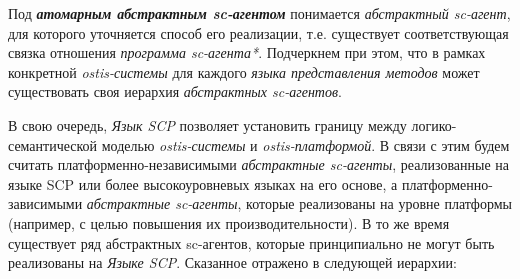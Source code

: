 Под \textbf{\textit{атомарным абстрактным sc-агентом}} понимается \textit{абстрактный sc-агент}, для которого уточняется способ его реализации, т.е. существует соответствующая связка отношения \textit{программа sc-агента*}. Подчеркнем при этом, что в рамках конкретной \textit{ostis-системы} для каждого \textit{языка представления методов} может существовать своя иерархия \textit{абстрактных sc-агентов}.

В свою очередь, \textit{Язык SCP} позволяет установить границу между логико-семантической моделью \textit{ostis-системы} и \textit{ostis-платформой}. В связи с этим будем считать платформенно-независимыми \textit{абстрактные sc-агенты}, реализованные на языке SCP или более высокоуровневых языках на его основе, а платформенно-зависимыми \textit{абстрактные sc-агенты}, которые реализованы на уровне платформы (например, с целью повышения их производительности). В то же время существует ряд абстрактных sc-агентов, которые принципиально не могут быть реализованы на \textit{Языке SCP}. Сказанное отражено в следующей иерархии:

